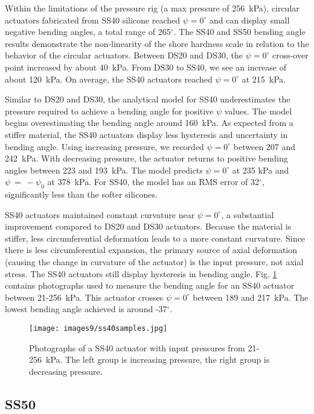 Within the limitations of the pressure rig (a max pressure of 256~kPa), circular actuators fabricated from SS40 silicone reached $\psi=0^\circ$ and can display small negative bending angles, a total range of 265$^\circ$. The SS40 and SS50 bending angle results demonstrate the non-linearity of the shore hardness scale in relation to the behavior of the circular actuators. Between DS20 and DS30, the $\psi=0^\circ$ cross-over point increased by about 40~kPa. From DS30 to SS40, we see an increase of about 120~kPa. On average, the SS40 actuators reached $\psi=0^\circ$ at 215~kPa. 

Similar to DS20 and DS30, the analytical model for SS40 underestimates the pressure required to achieve a bending angle for positive $\psi$ values. The model begins overestimating the bending angle around 160~kPa. As expected from a stiffer material, the SS40 actuators display less hysteresis and uncertainty in bending angle. Using increasing pressure, we recorded $\psi=0^\circ$ between 207 and 242~kPa. With decreasing pressure, the actuator returns to positive bending angles between 223 and 193~kPa. The model predicts $\psi=0^\circ$ at 235 kPa and $\psi~=~-\psi_0$ at 378~kPa. For SS40, the model has an RMS error of 32$^\circ$, significantly less than the softer silicones. 

SS40 actuators maintained constant curvature near $\psi=0^\circ$, a substantial improvement compared to DS20 and DS30 actuators. Because the material is stiffer, less circumferential deformation leads to a more constant curvature. Since there is less circumferential expansion, the primary source of axial deformation (causing the change in curvature of the actuator) is the input pressure, not axial stress. The SS40 actuators still display hysteresis in bending angle. Fig. \ref{fig:ss40samples} contains photographs used to measure the bending angle for an SS40 actuator between 21-256~kPa. This actuator crosses $\psi=0^\circ$ between 189 and 217~kPa. The lowest bending angle achieved is around -37$^\circ$. 

\begin{figure}[ht]
    \centering
     \texttt{[image: images9/ss40samples.jpg]}
    \caption{Photographs of a SS40 actuator with input pressures from 21-256~kPa. The left group is increasing pressure, the right group is decreasing pressure.}
    \label{fig:ss40samples}
\end{figure}

\clearpage
\subsection{SS50}

